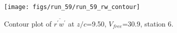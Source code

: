 \begin{figure}[H]
\centering
\texttt{[image: figs/run\_59/run\_59\_rw\_contour]}
\caption{Contour plot of $\overline{r^\prime w^\prime}$ at $z/c$=9.50, $V_{free}$=30.9, station 6.}
\label{fig:run_59_rw_contour}
\end{figure}


